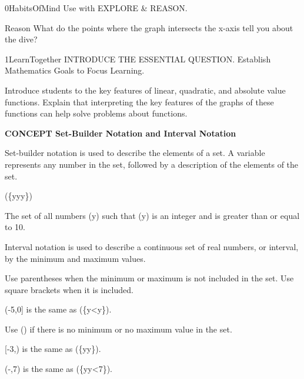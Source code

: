 \documentclass{article}
\newenvironment{concept-box}{}{}        %
\newenvironment{te-addendum}[2]{}{}     %
\newcommand{\answer}[1]{}               %
\begin{document}
\begin{te-addendum}{0}{HabitsOfMind}
Use with EXPLORE & REASON.

Reason What do the points where the graph intersects the x-axis tell you about the dive?
\answer{The points on the x-axis are when the diver is at the surface.}
\end{te-addendum}

\begin{te-addendum}{1}{LearnTogether}
INTRODUCE THE ESSENTIAL QUESTION. Establish Mathematics Goals to Focus Learning.

Introduce students to the key features of linear, quadratic, and absolute value functions. Explain that interpreting the key features of the graphs of these functions can help solve problems about functions.
\end{te-addendum}

\begin{concept-box}
\textbf{CONCEPT Set-Builder Notation and Interval Notation}

Set-builder notation is used to describe the elements of a set. A variable represents any number in the set, followed by a description of the elements of the set.

(\{y\mid yy\})

The set of all numbers (y) such that (y) is an integer and is greater than or equal to 10.

Interval notation is used to describe a continuous set of real numbers, or interval, by the minimum and maximum values.

Use parentheses when the minimum or maximum is not included in the set. Use square brackets when it is included.

(-5,0] is the same as (\{y<y\}).

Use (\pm\infty) if there is no minimum or no maximum value in the set.

[-3,\infty) is the same as (\{y\leq y\}).

(-\infty,7) is the same as (\{y\mid y<7\}).
\end{concept-box}
\end{document}
